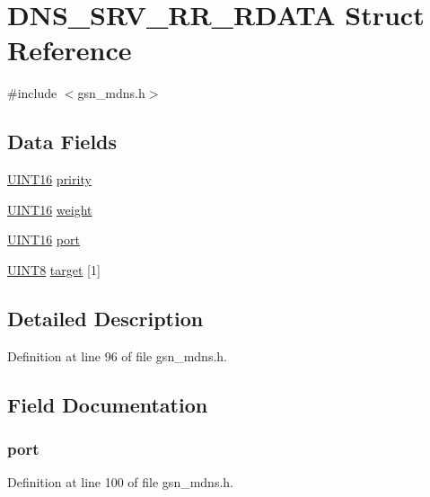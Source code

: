 \hypertarget{a00016}{
\section{DNS\_\-SRV\_\-RR\_\-RDATA Struct Reference}
\label{a00016}
}


{\ttfamily \#include $<$gsn\_\-mdns.h$>$}

\subsection*{Data Fields}
\begin{DoxyCompactItemize}
\item 
\hyperlink{a00660_ga09f1a1fb2293e33483cc8d44aefb1eb1}{UINT16} \hyperlink{a00016_a0e59088092c18a68163f7fee796aaae3}{pririty}
\item 
\hyperlink{a00660_ga09f1a1fb2293e33483cc8d44aefb1eb1}{UINT16} \hyperlink{a00016_ad38112381b19482ad69aec36b2a21692}{weight}
\item 
\hyperlink{a00660_ga09f1a1fb2293e33483cc8d44aefb1eb1}{UINT16} \hyperlink{a00016_a126a61701dc53e71d74b8e1b50c01ce3}{port}
\item 
\hyperlink{a00660_gab27e9918b538ce9d8ca692479b375b6a}{UINT8} \hyperlink{a00016_a10cc4b5db91d7a9547453a566067ba1e}{target} \mbox{[}1\mbox{]}
\end{DoxyCompactItemize}


\subsection{Detailed Description}


Definition at line 96 of file gsn\_\-mdns.h.



\subsection{Field Documentation}
\hypertarget{a00016_a126a61701dc53e71d74b8e1b50c01ce3}{
\subsubsection[{port}]{ {\bf port}}}
\label{a00016_a126a61701dc53e71d74b8e1b50c01ce3}


Definition at line 100 of file gsn\_\-mdns.h.

